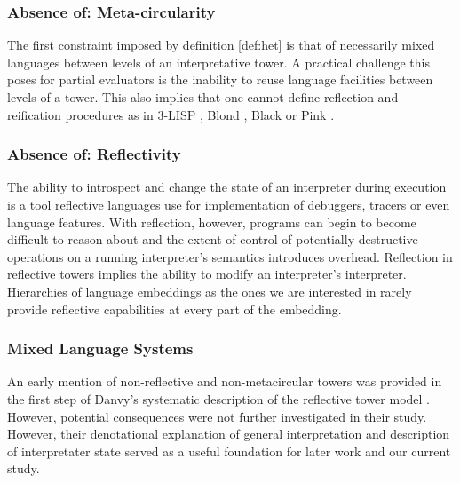 \documentclass{article}
\theoremstyle{definition}
\begin{document}
\subsubsection{Absence of: Meta-circularity}
The first constraint imposed by definition \ref{def:het} is that of necessarily mixed languages between levels of an interpretative tower. A practical challenge this poses for partial evaluators is the inability to reuse language facilities between levels of a tower. This also implies that one cannot define reflection and reification procedures as in 3-LISP \cite{smith1984reflection}, Blond \cite{danvy1988intensions}, Black \cite{asai1996duplication} or Pink \cite{amin2017collapsing}.

\subsubsection{Absence of: Reflectivity}
The ability to introspect and change the state of an interpreter during execution is a tool reflective languages use for implementation of debuggers, tracers or even language features. With reflection, however, programs can begin to become difficult to reason about and the extent of control of potentially destructive operations on a running interpreter's semantics introduces overhead. Reflection in reflective towers implies the ability to modify an interpreter's interpreter. Hierarchies of language embeddings as the ones we are interested in rarely provide reflective capabilities at every part of the embedding.

\subsubsection{Mixed Language Systems}
An early mention of non-reflective and non-metacircular towers was provided in the first step of Danvy's systematic description of the reflective tower model \cite{danvy1988intensions}. However, potential consequences were not further investigated in their study. However, their denotational explanation of general interpretation and description of interpretater state served as a useful foundation for later work and our current study.
\end{document}
